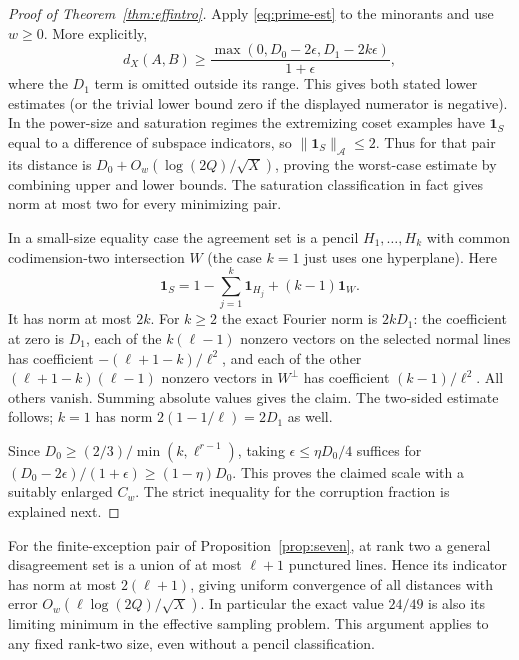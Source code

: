 \documentclass[11pt]{article}
\theoremstyle{remark}\newtheorem{remark}[theorem]{Remark}
\newcommand{\one}{\mathbf 1}
\newcommand{\normA}[1]{\lVert #1\rVert_{\mathcal A}}
\begin{document}
\begin{proof}[Proof of Theorem~\ref{thm:effintro}]
Apply \eqref{eq:prime-est} to the minorants and use $w\ge0$. More explicitly,
\begin{equation}\label{eq:dX}
 d_X(A,B)\ge \frac{\max(0,D_0-2\epsilon,D_1-2k\epsilon)}{1+\epsilon},
\end{equation}
where the $D_1$ term is omitted outside its range. This gives both stated lower estimates (or the trivial lower bound zero if the displayed numerator is negative). In the power-size and saturation regimes the extremizing coset examples have $\one_S$ equal to a difference of subspace indicators, so $\normA{\one_S}\le2$. Thus for that pair its distance is $D_0+O_w(\log(2Q)/\sqrt X)$, proving the worst-case estimate by combining upper and lower bounds. The saturation classification in fact gives norm at most two for every minimizing pair.

In a small-size equality case the agreement set is a pencil $H_1,\ldots,H_k$ with common codimension-two intersection $W$ (the case $k=1$ just uses one hyperplane). Here
\begin{equation}\label{eq:indicator}
 \one_S=1-\sum_{j=1}^k\one_{H_j}+(k-1)\one_W.
\end{equation}
It has norm at most $2k$. For $k\ge2$ the exact Fourier norm is $2kD_1$: the coefficient at zero is $D_1$, each of the $k(\ell-1)$ nonzero vectors on the selected normal lines has coefficient $-(\ell+1-k)/\ell^2$, and each of the other $(\ell+1-k)(\ell-1)$ nonzero vectors in $W^\perp$ has coefficient $(k-1)/\ell^2$. All others vanish. Summing absolute values gives the claim. The two-sided estimate follows; $k=1$ has norm $2(1-1/\ell)=2D_1$ as well.

Since $D_0\ge(2/3)/\min(k,\ell^{r-1})$, taking $\epsilon\le\eta D_0/4$ suffices for $(D_0-2\epsilon)/(1+\epsilon)\ge(1-\eta)D_0$. This proves the claimed scale with a suitably enlarged $C_w$. The strict inequality for the corruption fraction is explained next.
\end{proof}

For the finite-exception pair of Proposition~\ref{prop:seven}, at rank two a general disagreement set is a union of at most $\ell+1$ punctured lines. Hence its indicator has norm at most $2(\ell+1)$, giving uniform convergence of all distances with error $O_w(\ell\log(2Q)/\sqrt X)$. In particular the exact value $24/49$ is also its limiting minimum in the effective sampling problem. This argument applies to any fixed rank-two size, even without a pencil classification.
\end{document}
